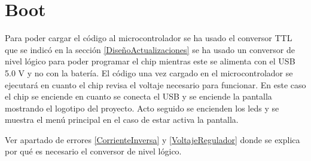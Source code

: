 \section{Boot}

Para poder cargar el código al microcontrolador se ha usado el conversor \gls{TTL} que se indicó en la sección \ref{DiseñoActualizaciones} se ha usado un conversor de nivel lógico para poder programar el chip mientras este se alimenta con el USB 5.0 V y no con la batería.
El código una vez cargado en el microcontrolador se ejecutará en cuanto el chip revisa el voltaje necesario para funcionar. En este caso el chip se enciende en cuanto se conecta el USB y se enciende la pantalla mostrando el logotipo del proyecto. Acto seguido se encienden los leds y se muestra el menú principal en el caso de estar activa la pantalla.

\begin{tcolorbox}[colback=red!11!white, colframe=red!50!white, title=Errores]
    Ver apartado de errores \ref{CorrienteInversa} y \ref{VoltajeRegulador} donde se explica por qué es necesario el conversor de nivel lógico.
\end{tcolorbox}